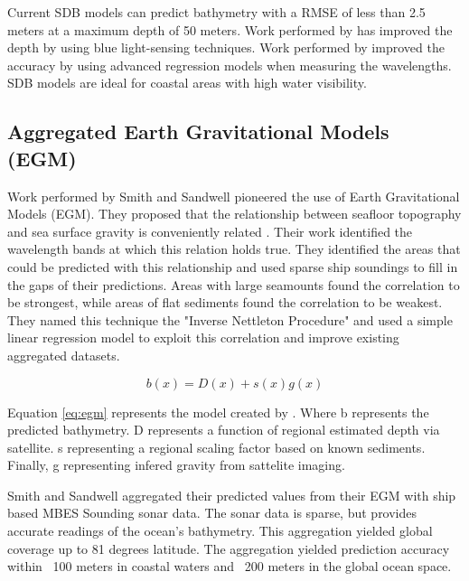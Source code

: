 \par
Current \ac{SDB} models can predict bathymetry with a \ac{RMSE} of less than 2.5 meters at a maximum depth of 50 meters.
Work performed by \cite{vinayaraj2016satellite} has improved the depth by using blue light-sensing techniques.
Work performed by \cite{chybicki2018three} improved the accuracy by using advanced regression models when measuring the wavelengths.
\ac{SDB} models are ideal for coastal areas with high water visibility.

\subsection{Aggregated Earth Gravitational Models (EGM)}
Work performed by Smith and Sandwell \cite{smith1994bathymetric}\cite{smith1997global} pioneered the use of Earth Gravitational Models (EGM).
They proposed that the relationship between seafloor topography and sea surface gravity is conveniently related \cite{smith1994bathymetric}.
Their work identified the wavelength bands at which this relation holds true.
They identified the areas that could be predicted with this relationship and used sparse ship soundings to fill in the gaps of their predictions.
Areas with large seamounts found the correlation to be strongest, while areas of flat sediments found the correlation to be weakest.
They named this technique the "Inverse Nettleton Procedure" and used a simple linear regression model to exploit this correlation and improve existing aggregated datasets.

\begin{equation}
    b(x) = D(x) + s(x)g(x) \label{eq:egm}
\end{equation}

\par
Equation \ref{eq:egm} represents the model created by \cite{smith1994bathymetric}.
Where b represents the predicted bathymetry.
D represents a function of regional estimated depth via satellite.
s representing a regional scaling factor based on known sediments.
Finally, g representing infered gravity from sattelite imaging.

\par
Smith and Sandwell aggregated their predicted values from their \ac{EGM} with ship based \ac{MBES} Sounding sonar data.
The sonar data is sparse, but provides accurate readings of the ocean's bathymetry.
This aggregation yielded global coverage up to 81 degrees latitude.
The aggregation yielded prediction accuracy within ~100 meters in coastal waters and ~200 meters in the global ocean space.

